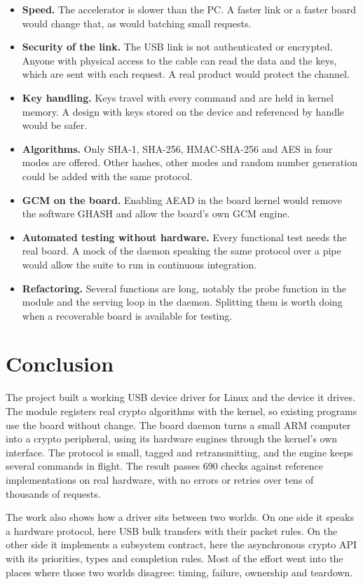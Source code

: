 \documentclass[11pt,a4paper,oneside]{report}
\begin{document}
\begin{itemize}
  \item \textbf{Speed.} The accelerator is slower than the PC. A faster link or a faster board would change that, as would batching small requests.
  \item \textbf{Security of the link.} The USB link is not authenticated or encrypted. Anyone with physical access to the cable can read the data and the keys, which are sent with each request. A real product would protect the channel.
  \item \textbf{Key handling.} Keys travel with every command and are held in kernel memory. A design with keys stored on the device and referenced by handle would be safer.
  \item \textbf{Algorithms.} Only SHA-1, SHA-256, HMAC-SHA-256 and AES in four modes are offered. Other hashes, other modes and random number generation could be added with the same protocol.
  \item \textbf{GCM on the board.} Enabling AEAD in the board kernel would remove the software GHASH and allow the board's own GCM engine.
  \item \textbf{Automated testing without hardware.} Every functional test needs the real board. A mock of the daemon speaking the same protocol over a pipe would allow the suite to run in continuous integration.
  \item \textbf{Refactoring.} Several functions are long, notably the probe function in the module and the serving loop in the daemon. Splitting them is worth doing when a recoverable board is available for testing.
\end{itemize}

\chapter{Conclusion}

The project built a working USB device driver for Linux and the device it drives. The module registers real crypto algorithms with the kernel, so existing programs use the board without change. The board daemon turns a small ARM computer into a crypto peripheral, using its hardware engines through the kernel's own interface. The protocol is small, tagged and retransmitting, and the engine keeps several commands in flight. The result passes 690 checks against reference implementations on real hardware, with no errors or retries over tens of thousands of requests.

The work also shows how a driver sits between two worlds. On one side it speaks a hardware protocol, here USB bulk transfers with their packet rules. On the other side it implements a subsystem contract, here the asynchronous crypto API with its priorities, types and completion rules. Most of the effort went into the places where those two worlds disagree: timing, failure, ownership and teardown.
\end{document}
